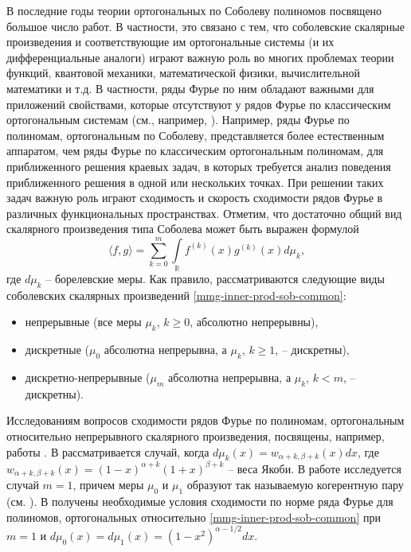 \Introduction

В последние годы теории ортогональных по Соболеву полиномов посвящено большое число работ. В частности, это связано с тем, что соболевские скалярные произведения и соответствующие им ортогональные системы (и их дифференциальные аналоги) играют важную роль во многих проблемах теории функций, квантовой механики, математической физики, вычислительной математики и т.д. В частности, ряды Фурье по ним обладают важными для приложений свойствами, которые отсутствуют у рядов Фурье по классическим ортогональным системам (см., например, \cite{Ram-Ba-Ra-Pe,Ram-Mar-Xu,Ram-Shar-UMN}).
Например, ряды Фурье по полиномам, ортогональным по Соболеву, представляется более естественным аппаратом, чем ряды Фурье по классическим ортогональным полиномам, для приближенного решения краевых задач, в которых требуется анализ поведения приближенного решения в одной или нескольких точках.
При решении таких задач важную роль играют сходимость и скорость сходимости рядов Фурье в различных функциональных пространствах.
Отметим, что достаточно общий вид скалярного произведения типа Соболева может быть выражен формулой
\begin{equation}\label{mmg-inner-prod-sob-common}
	\langle f,g \rangle = \sum_{k=0}^{m}\int\limits_{\mathbb{R}}f^{(k)}(x)g^{(k)}(x)d\mu_k,
\end{equation}
где $d\mu_k$ -- борелевские меры.
Как правило, рассматриваются следующие виды соболевских скалярных произведений \eqref{mmg-inner-prod-sob-common}:
\begin{itemize}
	\item
	непрерывные (все меры $\mu_k$, $k \ge 0$, абсолютно непрерывны),
	\item
	дискретные ($\mu_0$ абсолютна непрерывна, а $\mu_k$, $k \ge 1$, -- дискретны),
	\item
	дискретно-непрерывные ($\mu_m$ абсолютна непрерывна, а $\mu_k$, $k < m$, -- дискретны).	
\end{itemize}

Исследованиям вопросов сходимости рядов Фурье по полиномам, ортогональным относительно непрерывного скалярного произведения, посвящены, например, работы \cite{mmg-MarcellanJacobiSobolev,mmg-CiaurriJacobiSobolev,mmg-CiaurriCoherentPairs,mmg-Fejzullahu2010,mmg-Fejzullahu2013}. В \cite{mmg-MarcellanJacobiSobolev,mmg-CiaurriJacobiSobolev} рассматривается случай, когда $d\mu_k(x)=w_{\alpha+k,\beta+k}(x)dx$, где $w_{\alpha+k,\beta+k}(x)=(1-x)^{\alpha+k}(1+x)^{\beta+k}$ -- веса Якоби. В работе \cite{mmg-CiaurriCoherentPairs} исследуется случай $m=1$, причем меры $\mu_0$ и $\mu_1$ образуют так называемую когерентную пару (см. \cite{mmg-IserlesKoch1991,mmg-MarcellanXu2015}). В \cite{mmg-Fejzullahu2010} получены необходимые условия сходимости по норме ряда Фурье для полиномов, ортогональных относительно \eqref{mmg-inner-prod-sob-common} при $m=1$ и $d\mu_0(x)=d\mu_1(x)=(1-x^2)^{\alpha-1/2}dx$.

